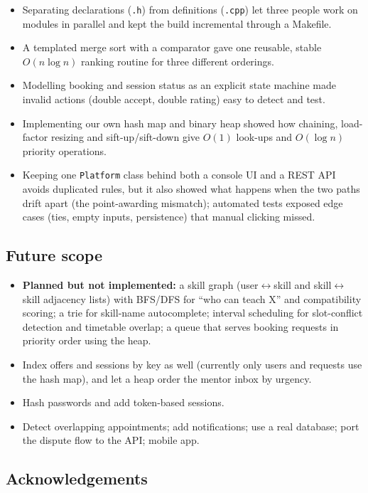 \documentclass[11pt,a4paper]{article}
\begin{document}
\begin{itemize}
\item Separating declarations (\texttt{.h}) from definitions (\texttt{.cpp}) let three people work on modules in parallel and kept the build incremental through a Makefile.
\item A templated merge sort with a comparator gave one reusable, stable $O(n\log n)$ ranking routine for three different orderings.
\item Modelling booking and session status as an explicit state machine made invalid actions (double accept, double rating) easy to detect and test.
\item Implementing our own hash map and binary heap showed how chaining, load-factor resizing and sift-up/sift-down give $O(1)$ look-ups and $O(\log n)$ priority operations.
\item Keeping one \texttt{Platform} class behind both a console UI and a REST API avoids duplicated rules, but it also showed what happens when the two paths drift apart (the point-awarding mismatch); automated tests exposed edge cases (ties, empty inputs, persistence) that manual clicking missed.
\end{itemize}

\subsection{Future scope}\label{sec:future}

\begin{itemize}[nosep]
\item \textbf{Planned but not implemented:} a skill graph (user$\leftrightarrow$skill and skill$\leftrightarrow$skill adjacency lists) with BFS/DFS for ``who can teach X'' and compatibility scoring; a trie for skill-name autocomplete; interval scheduling for slot-conflict detection and timetable overlap; a queue that serves booking requests in priority order using the heap.
\item Index offers and sessions by key as well (currently only users and requests use the hash map), and let a heap order the mentor inbox by urgency.
\item Hash passwords and add token-based sessions.
\item Detect overlapping appointments; add notifications; use a real database; port the dispute flow to the API; mobile app.
\end{itemize}

\subsection{Acknowledgements}
\end{document}
